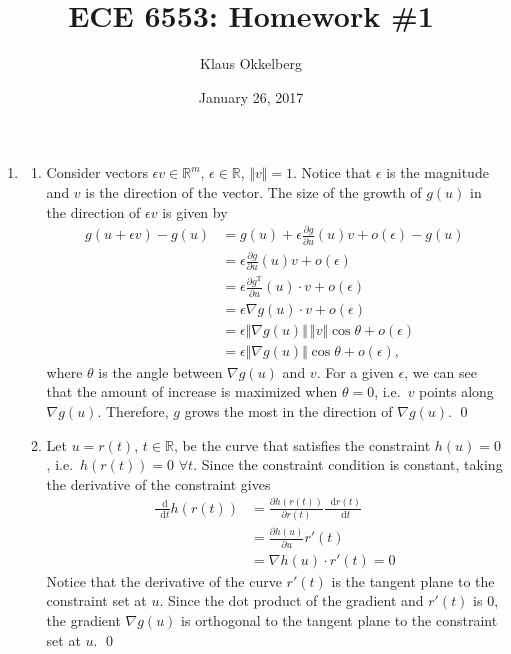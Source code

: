 \documentclass[letterpaper,12pt,titlepage]{article}
\newcommand*\dif{\mathop{}\!\mathrm{d}}
\newcommand{\trans}{^\text{T}}
\newcommand*\pder[2]{\frac{\partial #1}{\partial #2}}
\newcommand*\R{\mathbb{R}}
\begin{document}
\title{ECE 6553: Homework \#1}
\author{Klaus Okkelberg}
\date{January 26, 2017}
\maketitle


\begin{enumerate}[leftmargin=0pt]

\item \begin{enumerate}
  \item Consider vectors $\epsilon v\in\R^m$, $\epsilon\in\R$, $\Vert v\Vert=1$. Notice that $\epsilon$ is the magnitude and $v$ is the direction of the vector. The size of the growth of $g(u)$ in the direction of $\epsilon v$ is given by
    \begin{align}
      g(u+\epsilon v) - g(u) &= g(u) + \epsilon\pder{g}{u}(u)v + o(\epsilon) - g(u) \\
                             &= \epsilon\pder{g}{u}(u)v + o(\epsilon) \\
                             &= \epsilon \pder{g\trans}{u}(u) \cdot v + o(\epsilon) \\
                             &= \epsilon \nabla g(u) \cdot v + o(\epsilon) \\
                             &= \epsilon \Vert\nabla g(u)\Vert \, \Vert v\Vert \cos\theta + o(\epsilon) \\
                             &= \epsilon \Vert\nabla g(u)\Vert \cos\theta + o(\epsilon),
    \end{align}
    where $\theta$ is the angle between $\nabla g(u)$ and $v$. For a given $\epsilon$, we can see that the amount of increase is maximized when $\theta=0$, i.e.\ $v$ points along $\nabla g(u)$. Therefore, $g$ grows the most in the direction of $\nabla g(u)$. \qed

  \item Let $u=r(t)$, $t\in\R$, be the curve that satisfies the constraint $h(u)=0$, i.e.\ $h(r(t))=0$ $\forall t$. Since the constraint condition is constant, taking the derivative of the constraint gives
    \begin{align}
      \frac{\dif}{\dif t} h(r(t)) &= \pder{h(r(t))}{r(t)} \frac{\dif r(t)}{\dif t} \\
                                  &= \pder{h(u)}{u} r'(t) \\
                                  &= \nabla h(u) \cdot r'(t) = 0
    \end{align}
    Notice that the derivative of the curve $r'(t)$ is the tangent plane to the constraint set at $u$. Since the dot product of the gradient and $r'(t)$ is 0, the gradient $\nabla g(u)$ is orthogonal to the tangent plane to the constraint set at $u$. \qed
  \end{enumerate}


\end{enumerate}
\end{document}
